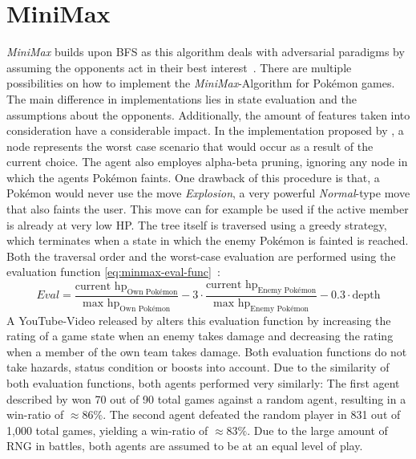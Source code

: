 \section{MiniMax}
\label{sec:related-minimax}
\textit{MiniMax} builds upon \ac{BFS} as this algorithm deals with adversarial paradigms by assuming the opponents 
act in their best interest~\autocite{Lee_Togelius_2017}.
There are multiple possibilities on how to implement the \textit{MiniMax}-Algorithm for Pokémon games. The main difference 
in implementations lies in state evaluation and the assumptions about the opponents. Additionally,
the amount of features taken into consideration have a considerable impact. In the implementation proposed by
\cite{Lee_Togelius_2017}, a node represents the worst case scenario that would occur as a result of the current choice. 
The agent also employes alpha-beta pruning, ignoring any node in which the agents Pokémon faints. 
One drawback of this procedure is that, a Pokémon would never use the move \textit{Explosion},
a very powerful \textit{Normal}-type move that also faints the user. This move can for example be used if
the active member is already at very low \ac{HP}.
The tree itself is traversed using a greedy strategy, which terminates when a state in which the enemy 
Pokémon is fainted is reached. Both the traversal order and the worst-case evaluation are performed using
the evaluation function \ref{eq:minmax-eval-func}~\autocite{Lee_Togelius_2017}:
\begin{equation}
\label{eq:minmax-eval-func}
    Eval = \frac{\text{current hp}_{\text{Own Pokémon}}}{\text{max hp}_{\text{Own Pokémon}}} -
    3 \cdot \frac{\text{current hp}_{\text{Enemy Pokémon}}}{\text{max hp}_{\text{Enemy Pokémon}}} -
    0.3 \cdot \text{depth}
\end{equation}
A YouTube-Video released by \cite{RemptonGames:PokemonAI}
alters this evaluation function
by increasing the rating of a game state when an enemy takes damage and decreasing the rating when a member
of the own team takes damage. Both evaluation functions do not take hazards, status condition or boosts 
into account. Due to the similarity of both evaluation functions, both agents performed very similarly:
The first agent described by \cite{Lee_Togelius_2017} won 70 out of 90 total games against a random agent,
resulting in a win-ratio of $\approx 86\%$. The second agent defeated the random player in 831 out of 1,000
total games, yielding a win-ratio of $\approx 83\%$. Due to the large amount of \ac{RNG} in battles,
both agents are assumed to be at an equal level of play. \\
